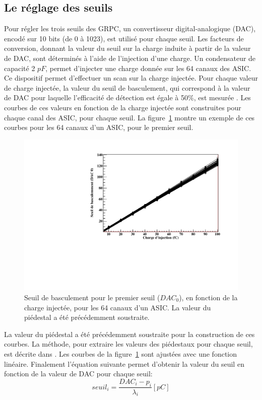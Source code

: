 \subsection{Le réglage des seuils}
\label{sec.sdhcal_thr}
Pour régler les trois seuils des GRPC, un convertisseur digital-analogique (DAC), encodé sur 10 bits (de 0 à 1023), est utilisé pour chaque seuil. Les facteurs de conversion, donnant la valeur du seuil sur la charge induite à partir de la valeur de DAC, sont déterminés à l'aide de l'injection d'une charge. Un condensateur de capacité 2 $pF$, permet d'injecter une charge donnée sur les 64 canaux des ASIC. Ce dispositif permet d'effectuer un scan sur la charge injectée. Pour chaque valeur de charge injectée, la valeur du seuil de basculement, qui correspond à la valeur de DAC pour laquelle l'efficacité de détection est égale à 50\%, est mesurée \cite{kieffer}. Les courbes de ces valeurs en fonction de la charge injectée sont construites pour chaque canal des ASIC, pour chaque seuil. La figure~\ref{dac-vs-inj} montre un exemple de ces courbes pour les 64 canaux d'un ASIC, pour le premier seuil. 
\begin{figure}[!ht]
  \centering
  \includegraphics[width=.7\textwidth]{SDHCAL/figs/Dac0Lin.pdf}
  \caption{Seuil de basculement pour le premier seuil ($DAC_0$), en fonction de la charge injectée, pour les 64 canaux d'un ASIC. La valeur du piédestal a été précédemment soustraite.}
  \label{dac-vs-inj}
\end{figure}
La valeur du piédestal a été précédemment soustraite pour la construction de ces courbes. La méthode, pour extraire les valeurs des piédestaux pour chaque seuil, est décrite dans \cite{kieffer}. Les courbes de la figure~\ref{dac-vs-inj} sont ajustées avec une fonction linéaire. Finalement l'équation suivante permet d'obtenir la valeur du seuil en fonction de la valeur de DAC pour chaque seuil:
\begin{equation}
  seuil_i = \frac{DAC_i-p_i}{\lambda_i} [pC]
  \label{eq.dacConversion}
\end{equation}
